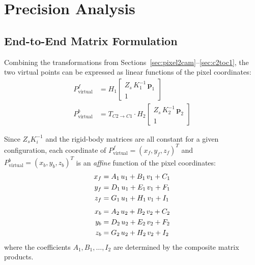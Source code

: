 \section{Precision Analysis}
\label{sec:precision}


\subsection{End-to-End Matrix Formulation}
\label{sec:matrix-form}

Combining the transformations from
Sections~\ref{sec:pixel2cam}--\ref{sec:c2toc1},
the two virtual points can be expressed as linear functions
of the pixel coordinates:
%
\begin{align}
  P^f_{\mathrm{virtual}}
    &= H_1
       \begin{bmatrix}
         Z_s\, K_1^{-1}\, \mathbf{p}_1 \\ 1
       \end{bmatrix}
  \label{eq:pf-end2end} \\[6pt]
  P^b_{\mathrm{virtual}}
    &= T_{C2 \to C1} \cdot H_2
       \begin{bmatrix}
         Z_s\, K_2^{-1}\, \mathbf{p}_2 \\ 1
       \end{bmatrix}
  \label{eq:pb-end2end}
\end{align}

Since $Z_s K_i^{-1}$ and the rigid-body matrices are all
constant for a given configuration,
each coordinate of
$P^f_{\mathrm{virtual}} = (x_f, y_f, z_f)^T$ and
$P^b_{\mathrm{virtual}} = (x_b, y_b, z_b)^T$
is an \emph{affine} function of the pixel coordinates:
%
\begin{align}
  x_f &= A_1\, u_1 + B_1\, v_1 + C_1 \notag\\
  y_f &= D_1\, u_1 + E_1\, v_1 + F_1 \notag\\
  z_f &= G_1\, u_1 + H_1\, v_1 + I_1
  \label{eq:affine-f}
\end{align}
\begin{align}
  x_b &= A_2\, u_2 + B_2\, v_2 + C_2 \notag\\
  y_b &= D_2\, u_2 + E_2\, v_2 + F_2 \notag\\
  z_b &= G_2\, u_2 + H_2\, v_2 + I_2
  \label{eq:affine-b}
\end{align}
%
where the coefficients $A_1, B_1, \ldots, I_2$ are
determined by the composite matrix products.

